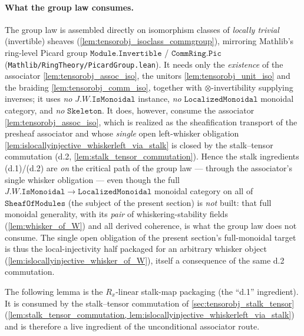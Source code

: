 \paragraph{What the group law consumes.} The group law is assembled directly on
isomorphism classes of \emph{locally trivial} (invertible) sheaves
(\cref{lem:tensorobj_isoclass_commgroup}), mirroring Mathlib's ring-level Picard
group \(\mathtt{Module.Invertible}\) / \(\mathtt{CommRing.Pic}\)
(\texttt{Mathlib/RingTheory/PicardGroup.lean}). It needs only the \emph{existence} of
the associator \cref{lem:tensorobj_assoc_iso}, the unitors \cref{lem:tensorobj_unit_iso}
and the braiding \cref{lem:tensorobj_comm_iso}, together with \(\otimes\)-invertibility
supplying inverses; it uses \emph{no} \(J.W.\mathtt{IsMonoidal}\) instance, \emph{no}
\(\mathtt{LocalizedMonoidal}\) monoidal category, and \emph{no} \(\mathtt{Skeleton}\).
It does, however, consume the associator \cref{lem:tensorobj_assoc_iso}, which is
realized as the sheafification transport of the presheaf associator and whose
\emph{single} open left-whisker obligation \cref{lem:islocallyinjective_whiskerleft_via_stalk}
is closed by the stalk--tensor commutation (d.2, \cref{lem:stalk_tensor_commutation}).
Hence the stalk ingredients (d.1)/(d.2) are \emph{on} the critical path of the group
law --- through the associator's single whisker obligation --- even though the full
\(J.W.\mathtt{IsMonoidal} \to \mathtt{LocalizedMonoidal}\) monoidal category on all of
\(\mathtt{SheafOfModules}\) (the subject of the present section) is \emph{not} built:
that full monoidal generality, with its \emph{pair} of whiskering-stability fields
(\cref{lem:whisker_of_W}) and all derived coherence, is what the group law does not
consume. The single open obligation of the present section's full-monoidal target is
thus the local-injectivity half packaged for an arbitrary whisker object
(\cref{lem:islocallyinjective_whisker_of_W}), itself a consequence of the same d.2
commutation.

The following lemma is the \(R_x\)-linear stalk-map packaging (the ``d.1''
ingredient). It is consumed by the stalk--tensor commutation of
\cref{sec:tensorobj_stalk_tensor} (\cref{lem:stalk_tensor_commutation,
lem:islocallyinjective_whiskerleft_via_stalk}) and is therefore a live ingredient
of the unconditional associator route.

